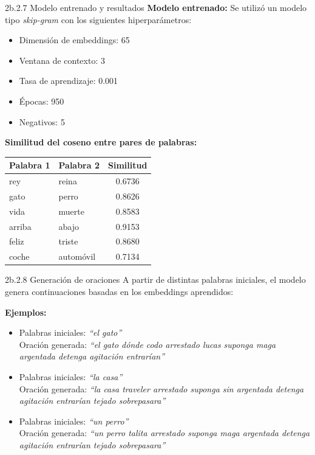 \documentclass{beamer}
\begin{document}
\begin{frame}{2b.2.7 Modelo entrenado y resultados}
	\justifying
	\textbf{Modelo entrenado:} Se utilizó un modelo tipo \textit{skip-gram} con los siguientes hiperparámetros:
	\begin{itemize}
		\item Dimensión de embeddings: 65
		\item Ventana de contexto: 3
		\item Tasa de aprendizaje: 0.001
		\item Épocas: 950
		\item Negativos: 5
	\end{itemize}
	
	\vspace{0.3cm}
	\textbf{Similitud del coseno entre pares de palabras:}
	\begin{table}[]
		\centering
		\begin{tabular}{l l c}
			\hline
			Palabra 1 & Palabra 2 & Similitud \\
			\hline
			rey     & reina     & 0.6736 \\
			gato    & perro     & 0.8626 \\
			vida    & muerte    & 0.8583 \\
			arriba  & abajo     & 0.9153 \\
			feliz   & triste    & 0.8680 \\
			coche   & automóvil & 0.7134 \\
			\hline
		\end{tabular}
	\end{table}
	
\end{frame}


\begin{frame}{2b.2.8 Generación de oraciones}
	\justifying
	A partir de distintas palabras iniciales, el modelo genera continuaciones basadas en los embeddings aprendidos:
	
	\vspace{0.3cm}
	\textbf{Ejemplos:}
	\begin{itemize}
		\item Palabras iniciales: \textit{``el gato''} \\
		Oración generada: \textit{``el gato dónde codo arrestado lucas suponga maga argentada detenga agitación entrarían''}
		\item Palabras iniciales: \textit{``la casa''} \\
		Oración generada: \textit{``la casa traveler arrestado suponga sin argentada detenga agitación entrarían tejado sobrepasara''}
		\item Palabras iniciales: \textit{``un perro''} \\
		Oración generada: \textit{``un perro talita arrestado suponga maga argentada detenga agitación entrarían tejado sobrepasara''}
	\end{itemize}
\end{frame}
\end{document}
